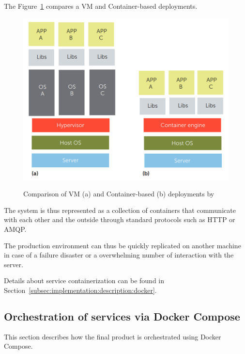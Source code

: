 The Figure~\ref{fig:implementation:decisions:docker:contvsvm} compares a \gls{VM} and Container-based deployments.

\begin{figure}[H]
    \centering
    \resizebox{0.7\columnwidth}{!}
    {
       \includegraphics{assets/figures/vmvscontainer.png}
    }
    \caption[Comparison of VM and Container-based deployments]{Comparison of VM (a) and Container-based (b) deployments by \cite{bernstein2014containers}}
    \label{fig:implementation:decisions:docker:contvsvm}
\end{figure}

The system is thus represented as a collection of containers that communicate with each other and the outside through standard protocols such as HTTP or AMQP.

The production environment can thus be quickly replicated on another machine in case of a failure disaster or a overwhelming number of interaction with the server.

Details about service containerization can be found in Section~\ref{subsec:implementation:description:docker}.

\subsection{Orchestration of services via Docker Compose}
\label{subsec:implementation:decisions:compose}

This section describes how the final product is orchestrated using Docker Compose.

